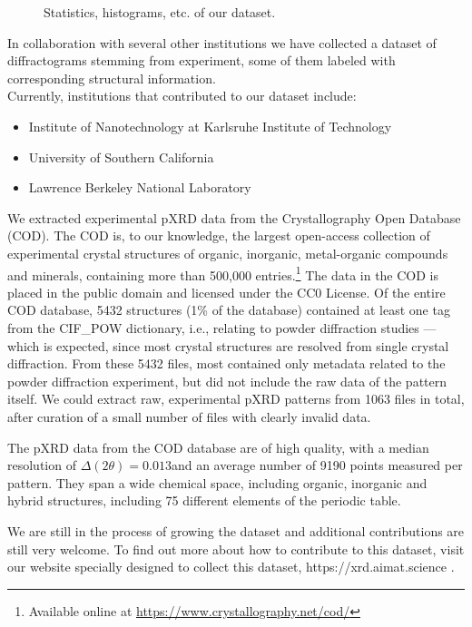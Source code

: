 



\begin{figure*}[!ht]
    \centering
    \missingfigure{} 
    \caption{Statistics, histograms, etc. of our dataset.}
    \label{fig:statistics}
\end{figure*}

In collaboration with several other institutions we have collected a dataset of diffractograms stemming from experiment, some of them labeled with corresponding structural information. \\
Currently, institutions that contributed to our dataset include:
\begin{itemize}
    \item Institute of Nanotechnology at Karlsruhe Institute of Technology
    \item University of Southern California
    \item Lawrence Berkeley National Laboratory
\end{itemize}


We extracted experimental pXRD data from the Crystallography Open Database (COD).\cite{Grazulis2009, Vaitkus2023}  The COD is, to our knowledge, the largest open-access collection of experimental crystal structures of organic, inorganic, metal-organic compounds and minerals, containing more than 500,000 entries.\footnote{Available online at \url{https://www.crystallography.net/cod/}} The data in the COD is placed in the public domain and licensed under the CC0 License. Of the entire COD database, 5432 structures (1\% of the database) contained at least one tag from the {CIF\_POW} dictionary, i.e., relating to powder diffraction studies --- which is expected, since most crystal structures are resolved from single crystal diffraction. From these 5432 files, most contained only metadata related to the powder diffraction experiment, but did not include the raw data of the pattern itself. We could extract raw, experimental pXRD patterns from 1063 files in total, after curation of a small number of files with clearly invalid data.

The pXRD data from the COD database are of high quality, with a median resolution of $\Delta(2\theta) = 0.013$\textdegree and an average number of 9190 points measured per pattern. They span a wide chemical space, including organic, inorganic and hybrid structures, including 75 different elements of the periodic table.


We are still in the process of growing the dataset and additional contributions are still very welcome. To find out more about how to contribute to this dataset, visit our website specially designed to collect this dataset, https://xrd.aimat.science .